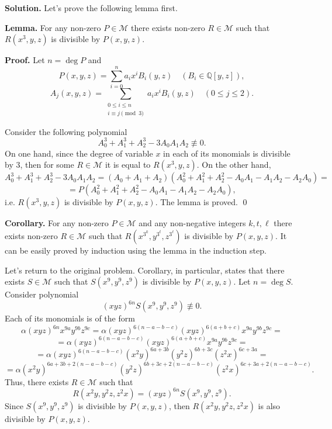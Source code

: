 \documentclass[12pt]{article}
\newcounter{problem}
\def \solution{\par \bigskip \textbf{Solution. }}
\def \Lemma{\par \bigskip \textbf{Lemma. }}
\def \proof{\par \bigskip \textbf{Proof. }}
\def \corollary{\par \bigskip \textbf{Corollary. }}
\begin{document}
\solution Let's prove the following lemma first.

\Lemma For any non-zero $P \in \mathcal{M}$ there exists non-zero $R \in \mathcal{M}$ such that $R(x^3, y, z)$ is divisible by $P(x, y, z)$.

\proof Let $n = \deg P$ and
$$
P(x, y, z)
=
\sum_{i = 0}^{n}
a_i x^i B_i(y, z)
\quad
(B_i \in \mathbb{Q}[y, z]),
$$
$$
A_j(x, y, z)
=
\sum_{\substack{0 \le i \le n \\ i \equiv j \pmod{3}}}
a_i x^i B_i(y, z)
\quad
(0 \le j \le 2)
.
$$

Consider the following polynomial
$$
A_0^3 + A_1^3 + A_2^3 - 3 A_0 A_1 A_2 \not\equiv 0
.
$$
On one hand, since the degree of variable $x$ in each of its monomials is divisible by 3, then for some $R \in \mathcal{M}$ it is equal to $R(x^3, y, z)$. On the other hand,
$$
A_0^3 + A_1^3 + A_2^3 - 3 A_0 A_1 A_2 
=
(A_0 + A_1 + A_2)
(A_0^2 + A_1^2 + A_2^2 - A_0 A_1 - A_1 A_2 - A_2 A_0)
=
$$
$$
=
P (A_0^2 + A_1^2 + A_2^2 - A_0 A_1 - A_1 A_2 - A_2 A_0)
,
$$
i.e. $R(x^3, y, z)$ is divisible by $P(x, y, z)$. The lemma is proved.
\qed

\corollary For any non-zero $P \in \mathcal{M}$ and any non-negative integers $k, t, \ell$ there exists non-zero $R \in \mathcal{M}$ such that $R(x^{3^k}, y^{3^t}, z^{3^\ell})$ is divisible by $P(x, y, z)$. It can be easily proved by induction using the lemma in the induction step.

\medskip

Let's return to the original problem. Corollary, in particular, states that there exists $S \in \mathcal{M}$ such that $S(x^9, y^9, z^9)$ is divisible by $P(x, y, z)$. Let $n = \deg S$. Consider polynomial
$$
(xyz)^{6n} S(x^9, y^9, z^9) \not \equiv 0
.
$$
Each of its monomials is of the form
$$
\alpha (xyz)^{6n} x^{9a} y^{9b} z^{9c}
=
\alpha 
(xyz)^{6 (n - a - b - c)}
(xyz)^{6 (a + b + c)}
x^{9a} y^{9b} z^{9c}
=
$$
$$
=
\alpha 
(xyz)^{6 (n - a - b - c)}
(xyz)^{6 (a + b + c)}
x^{9a} y^{9b} z^{9c}
=
$$
$$
=
\alpha 
(xyz)^{6 (n - a - b - c)}
(x^2y)^{6a+3b}(y^2z)^{6b+3c}(z^2x)^{6c+3a}
=
$$
$$
=
\alpha
(x^2y)^{6a+3b + 2 (n - a - b - c)}
(y^2z)^{6b+3c + 2 (n - a - b - c)}
(z^2x)^{6c+3a + 2 (n - a - b - c)}
.
$$
Thus, there exists $R \in \mathcal{M}$ such that
$$
R(x^2 y, y^2 z, z^2 x)
=
(xyz)^{6n} S(x^9, y^9, z^9)
.
$$
Since $S(x^9, y^9, z^9)$ is divisible by $P(x, y, z)$, then $R(x^2 y, y^2 z, z^2 x)$ is also divisible by $P(x, y, z)$.
\end{document}
